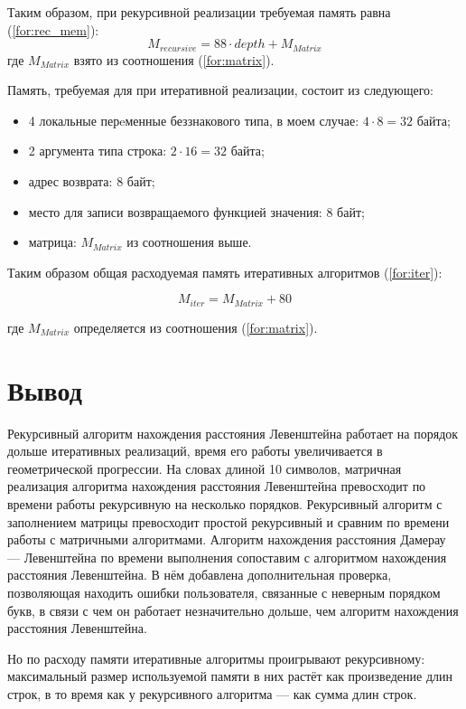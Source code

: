 Таким образом, при рекурсивной реализации требуемая память равна (\ref{for:rec_mem}):
\begin{equation}
M_{recursive} = 88 \cdot depth + M_{Matrix}
\label{for:rec_mem}
\end{equation}
где $M_{Matrix}$ взято из соотношения (\ref{for:matrix}).

Память, требуемая для при итеративной реализации, состоит из следующего:
\begin{itemize}
    \item 4 локальные перeменные беззнакового типа, в моем случае: $4 \cdot 8 = 32$ байта;
    \item 2 аргумента типа строка: $2 \cdot 16 = 32$ байта;
    \item адрес возврата: 8 байт;
    \item место для записи возвращаемого функцией значения: 8 байт;
    \item матрица: $M_{Matrix}$ из соотношения выше.
\end{itemize}

Таким образом общая расходуемая память итеративных алгоритмов (\ref{for:iter}):

\begin{equation}
M_{iter} = M_{Matrix} + 80
\label{for:iter}
\end{equation}

где $M_{Matrix}$ определяется из соотношения (\ref{for:matrix}).


\section*{Вывод}

Рекурсивный алгоритм нахождения расстояния Левенштейна работает на порядок дольше итеративных реализаций, время его работы увеличивается в геометрической прогрессии. На словах длиной 10 символов, матричная реализация алгоритма нахождения расстояния Левенштейна превосходит по времени работы рекурсивную на несколько порядков. Рекурсивный алгоритм с заполнением матрицы превосходит простой рекурсивный и сравним по времени работы с матричными алгоритмами. Алгоритм нахождения расстояния Дамерау — Левенштейна по времени выполнения сопоставим с алгоритмом нахождения расстояния Левенштейна. В нём добавлена дополнительная проверка, позволяющая находить ошибки пользователя, связанные с неверным порядком букв, в связи с чем он работает незначительно дольше, чем алгоритм нахождения расстояния Левенштейна.

Но по расходу памяти итеративные алгоритмы проигрывают рекурсивному: максимальный размер используемой памяти в них растёт как произведение длин строк, в то время как у рекурсивного алгоритма — как сумма длин строк.
